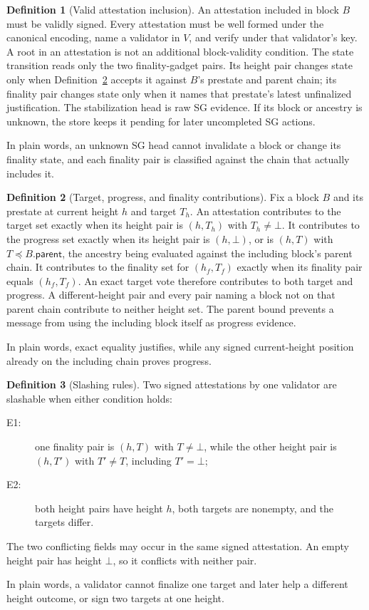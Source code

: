 \ifx\litemode\undefined\documentclass{article}\fi
\theoremstyle{plain}
\theoremstyle{definition}
\newtheorem{definition}{Definition}
\theoremstyle{remark}
\newcommand{\parent}{\mathsf{parent}}
\begin{document}
\begin{definition}[Valid attestation inclusion]
\label{def:valid-attestation-inclusion}
An attestation included in block \(B\) must be validly signed.  Every
attestation must be well formed under the canonical encoding, name a validator
in \(V\), and verify under that validator's key.  A root in an attestation is
not an additional block-validity condition.  The state transition reads only
the two finality-gadget pairs.  Its height pair changes state only when
Definition~\ref{def:vote-contribution} accepts it against \(B\)'s prestate and
parent chain; its finality pair changes state only when it names that
prestate's latest unfinalized justification.  The stabilization head is raw
SG evidence.  If its block or ancestry is unknown, the store keeps it pending
for later uncompleted SG actions.

In plain words, an unknown SG head cannot invalidate a block or change its
finality state, and each finality pair is classified against the chain that
actually includes it.
\end{definition}

\begin{definition}[Target, progress, and finality contributions]
\label{def:vote-contribution}
Fix a block \(B\) and its prestate at current height \(h\) and target \(T_h\).
An attestation contributes to the target set exactly when its height pair is
\((h,T_h)\) with \(T_h\neq\bot\).  It contributes to the progress set exactly
when its height pair is \((h,\bot)\), or is \((h,T)\) with
\(T\preceq B.\parent\), the ancestry being evaluated against the
including block's parent chain.  It contributes to the finality set for \((h_f,T_f)\)
exactly when its finality pair equals \((h_f,T_f)\).
An exact target vote therefore contributes to both target and progress.
A different-height pair and every pair naming a block not on that parent chain
contribute to neither height set.  The parent bound prevents a message from
using the including block itself as progress evidence.

In plain words, exact equality justifies, while any signed current-height
position already on the including chain proves progress.
\end{definition}

\begin{definition}[Slashing rules]\label{def:slashing}
Two signed attestations by one validator are slashable when either condition
holds:
\begin{description}
  \item[E1:] one finality pair is \((h,T)\) with \(T\neq\bot\), while the
  other height pair is \((h,T')\) with \(T'\neq T\), including
  \(T'=\bot\);
  \item[E2:] both height pairs have height \(h\), both targets are nonempty,
  and the targets differ.
\end{description}
The two conflicting fields may occur in the same signed attestation.
An empty height pair has height \(\bot\), so it conflicts with neither pair.

In plain words, a validator cannot finalize one target and later help a
different height outcome, or sign two targets at one height.
\end{definition}
\end{document}
